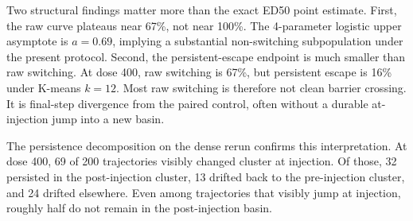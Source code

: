 \documentclass{article}
\theoremstyle{plain}
\theoremstyle{definition}
\begin{document}
Two structural findings matter more than the exact ED50 point estimate. First, the raw curve plateaus near 67\%, not near 100\%. The 4-parameter logistic upper asymptote is $a = 0.69$, implying a substantial non-switching subpopulation under the present protocol. Second, the persistent-escape endpoint is much smaller than raw switching. At dose 400, raw switching is 67\%, but persistent escape is 16\% under K-means $k=12$. Most raw switching is therefore not clean barrier crossing. It is final-step divergence from the paired control, often without a durable at-injection jump into a new basin.

The persistence decomposition on the dense rerun confirms this interpretation. At dose 400, 69 of 200 trajectories visibly changed cluster at injection. Of those, 32 persisted in the post-injection cluster, 13 drifted back to the pre-injection cluster, and 24 drifted elsewhere. Even among trajectories that visibly jump at injection, roughly half do not remain in the post-injection basin.
\end{document}
